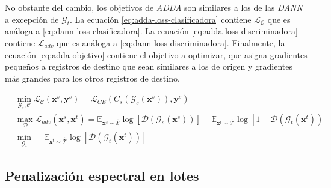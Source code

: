 No obstante del cambio, los objetivos de {\it ADDA} son similares a los de las {\it DANN} a excepción de
$\mathcal{G}_t$. La ecuación \ref{eq:adda-loss-clasificadora} contiene $\mathcal{L}_\mathcal{C}$ que es análoga a
\ref{eq:dann-loss-clasificadora}. La ecuación \ref{eq:adda-loss-discriminadora} contiene $\mathcal{L}_{adv}$ que es
análoga a \ref{eq:dann-loss-discriminadora}. Finalmente, la ecuación \ref{eq:adda-objetivo} contiene el objetivo a
optimizar, que asigna gradientes pequeños a registros de destino que sean similares a los de origen y gradientes más
grandes para los otros registros de destino.

\begin{align}
     & \min_{\mathcal{G}_s, \mathcal{C}} \mathcal{L}_\mathcal{C}(\mathbf{x}^s, \mathbf{y}^s)                                                            = \mathcal{L}_{CE}(C_s(\mathcal{G}_s(\mathbf{x}^s)), \mathbf{y}^s)
    \label{eq:adda-loss-clasificadora}                                                                                                                                                                                                                                                                                                                                                          \\
     & \max_{\mathcal{D}} \mathcal{L}_{adv}(\mathbf{x}^s, \mathbf{x}^t)                                                                                 = \mathbb{E}_{\mathbf{x}^s \sim \mathcal{\hat{S}}}\log[\mathcal{D}(\mathcal{G}_s(\mathbf{x}^s))] + \mathbb{E}_{\mathbf{x}^t \sim \mathcal{\hat{T}}}\log[1-\mathcal{D}(\mathcal{G}_t(\mathbf{x}^t))] \label{eq:adda-loss-discriminadora} \\
     & \min_{\mathcal{G}_t} - \mathbb{E}_{\mathbf{x}^t \sim \mathcal{\hat{T}}} \log[\mathcal{D}(\mathcal{G}_t(\mathbf{x}^t))]  \label{eq:adda-objetivo}
\end{align}

\subsection{Penalización espectral en lotes}

